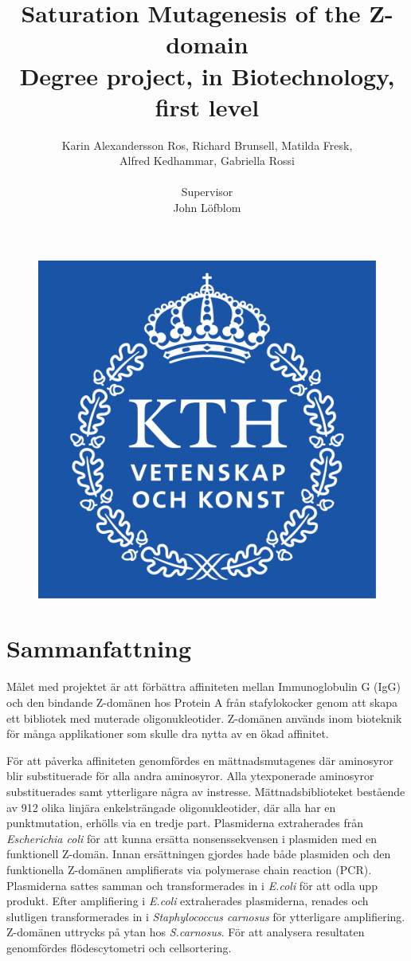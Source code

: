 \documentclass{article}
\begin{document}
	\begin{figure}
		\includegraphics[width=0.3\linewidth]{images/kth_logga.png}
	\end{figure}
	\title{\vspace{10mm} Saturation Mutagenesis of the Z-domain\\{\Large Degree project, in Biotechnology, first level}}
	\author{Karin Alexandersson Ros, Richard Brunsell, Matilda Fresk,\\Alfred Kedhammar, Gabriella Rossi \\ \\ Supervisor \\ John Löfblom}
	\maketitle

	\newpage
	\section*{Sammanfattning}
		Målet med projektet är att förbättra affiniteten mellan Immunoglobulin G (IgG) och den bindande Z-domänen hos Protein A från stafylokocker genom att skapa ett bibliotek med muterade oligonukleotider. Z-domänen används inom bioteknik för många applikationer som skulle dra nytta av en ökad affinitet. 
		
		För att påverka affiniteten genomfördes en mättnadsmutagenes där aminosyror blir substituerade för alla andra aminosyror. Alla ytexponerade aminosyror substituerades samt ytterligare några av instresse. Mättnadsbiblioteket bestående av 912 olika linjära enkelsträngade oligonukleotider, där alla har en punktmutation, erhölls via en tredje part. Plasmiderna extraherades från \textit{Escherichia coli} för att kunna ersätta nonsenssekvensen i plasmiden med en funktionell Z-domän. Innan ersättningen gjordes hade både plasmiden och den funktionella Z-domänen amplifierats via polymerase chain reaction (PCR). Plasmiderna sattes samman och transformerades in i \textit{E.coli} för att odla upp produkt. Efter amplifiering i \textit{E.coli} extraherades plasmiderna, renades och slutligen transformerades in i \textit{Staphylococcus carnosus} för ytterligare amplifiering. Z-domänen uttrycks på ytan hos \textit{S.carnosus}. För att analysera resultaten genomfördes flödescytometri och cellsortering.
		
\end{document}
